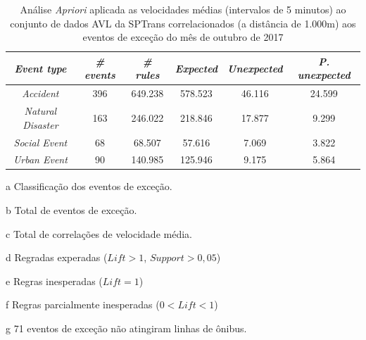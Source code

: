 \documentclass[
	12pt,				%
	oneside,			%
	a4paper,			%
	english,			%
	brazil				%
	]{abntex2ppgsi}
\begin{document}
{{\begin{apendicesenv}
\begin{table}[!htb]
\centering
\begin{threeparttable}
\caption {Análise \textit{Apriori} aplicada as velocidades médias (intervalos de 5 minutos) ao conjunto de dados AVL da SPTrans correlacionados (a distância de 1.000m) aos eventos de exceção do mês de outubro de 2017}
\label {tab:aprioriFull}
\begin{tabular}{c|c|c|c|c|c}
\hline
\textbf{\textit{Event type}}\tnote{a} & \textbf{\textit{\# events}}\tnote{b} & \textit{\textbf{\# rules}}\tnote{c} & \textbf{\textit{Expected}}\tnote{d} & \textbf{\textit{Unexpected}}\tnote{e} & \textbf{\textit{P. unexpected}}\tnote{f}   \\
\hline
\textit{Accident} & 396 & 649.238 & 578.523 & 46.116 & 24.599 \\
\textit{Natural Disaster} & 163 & 246.022 & 218.846 & 17.877 & 9.299 \\
\textit{Social Event} & 68 & 68.507 & 57.616 & 7.069 & 3.822 \\
\textit{Urban Event} & 90 & 140.985 & 125.946 & 9.175 & 5.864 \\
\hline
\end{tabular}
\begin{tablenotes}
            \item[a] Classificação dos eventos de exceção.
            \item[b] Total de eventos de exceção.
            \item[c] Total de correlações de velocidade média.
            \item[d] Regradas experadas ($Lift > 1$, $Support > 0,05$)
            \item[e] Regras inesperadas ($Lift = 1$)
            \item[f] Regras parcialmente inesperadas ($0 < Lift < 1$)
            \item[g] 71 eventos de exceção não atingiram linhas de ônibus.
        \end{tablenotes}
\end{threeparttable}
\end{table}


\end{apendicesenv}}}
\end{document}
